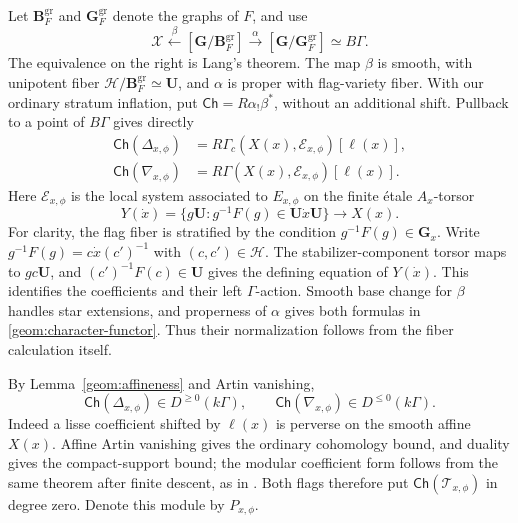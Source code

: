 Let \(\mathbf B_F^{\mathrm{gr}}\) and
\(\mathbf G_F^{\mathrm{gr}}\) denote the graphs of \(F\), and use
\[
 \mathcal X\xleftarrow{\ \beta\ }
 [\mathbf G/\mathbf B_F^{\mathrm{gr}}]
 \xrightarrow{\ \alpha\ }
 [\mathbf G/\mathbf G_F^{\mathrm{gr}}]\simeq B\Gamma.
\]
The equivalence on the right is Lang's theorem. The map \(\beta\)
is smooth, with unipotent fiber
\(\mathcal H/\mathbf B_F^{\mathrm{gr}}\simeq\mathbf U\), and
\(\alpha\) is proper with flag-variety fiber.
With our ordinary stratum inflation, put
\(\mathsf{Ch}=R\alpha_!\beta^*\), without an additional shift.
Pullback to a point of \(B\Gamma\) gives directly
\begin{equation}\label{geom:character-functor}
 \begin{aligned}
 \mathsf{Ch}(\Delta_{x,\phi})
   &=R\Gamma_c(X(x),\mathcal E_{x,\phi})[\ell(x)],\\
 \mathsf{Ch}(\nabla_{x,\phi})
   &=R\Gamma(X(x),\mathcal E_{x,\phi})[\ell(x)].
 \end{aligned}
\end{equation}
Here \(\mathcal E_{x,\phi}\) is the local system associated to
\(E_{x,\phi}\) on the finite \'etale \(A_x\)-torsor
\[
 Y(\dot x)=\{g\mathbf U:g^{-1}F(g)\in\mathbf U\dot x\mathbf U\}
 \longrightarrow X(x).
\]
For clarity, the flag fiber is stratified by the condition
\(g^{-1}F(g)\in\mathbf G_x\). Write
\(g^{-1}F(g)=c\dot x(c')^{-1}\) with \((c,c')\in\mathcal H\).
The stabilizer-component torsor maps to \(gc\mathbf U\), and
\((c')^{-1}F(c)\in\mathbf U\) gives the defining equation of
\(Y(\dot x)\). This identifies the coefficients and their left
\(\Gamma\)-action. Smooth base change for \(\beta\) handles star
extensions, and properness of \(\alpha\) gives both formulas in
\eqref{geom:character-functor}. Thus their normalization follows from
the fiber calculation itself.

By Lemma~\ref{geom:affineness} and Artin vanishing,
\[
 \mathsf{Ch}(\Delta_{x,\phi})\in D^{\ge0}(k\Gamma),
 \qquad
 \mathsf{Ch}(\nabla_{x,\phi})\in D^{\le0}(k\Gamma).
\]
Indeed a lisse coefficient shifted by \(\ell(x)\) is perverse on the
smooth affine \(X(x)\). Affine Artin vanishing gives the ordinary
cohomology bound, and duality gives the compact-support bound;
the modular coefficient form follows from the same theorem after
finite descent, as in
\cite[Section~4.0, Theorem~4.1.1 and Corollary~4.1.2]{BBD}.
Both flags therefore put
\(\mathsf{Ch}(\mathcal T_{x,\phi})\) in degree zero. Denote this module
by \(P_{x,\phi}\).

